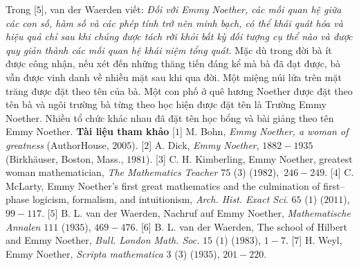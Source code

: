 \begin{multicols}{2}
	\vskip 0.05cm
	Trong [$5$], van der Waerden viết:
	\vskip 0.05cm
	\textit{Đối với Emmy Noether, các mối quan hệ giữa các con số, hàm số và các phép tính trở nên minh bạch, có thể khái quát hóa và hiệu quả chỉ sau khi chúng được tách rời khỏi bất kỳ đối tượng cụ thể nào và được quy giản thành các mối quan hệ khái niệm tổng quát.}
	\vskip 0.05cm
	Mặc dù trong đời bà ít được công nhận, nếu xét đến những thăng tiến đáng kể mà bà đã đạt được, bà vẫn được vinh danh về nhiều mặt sau khi qua đời. Một miệng núi lửa trên mặt trăng được đặt theo tên của bà. Một con phố ở quê hương Noether được đặt theo tên bà và ngôi trường bà từng theo học hiện được đặt tên là Trường Emmy Noether. Nhiều tổ chức khác nhau đã đặt tên học bổng và bài giảng theo tên Emmy Noether.
	\vskip 0.05cm
	\textbf{\color{lichsutoanhoc}Tài liệu tham khảo}
	\vskip 0.05cm
	[$1$] M. Bohn, \textit{Emmy Noether, a woman of greatness} (AuthorHouse, $2005$).
	\vskip 0.05cm
	[$2$] A. Dick, \textit{Emmy Noether}, $1882-1935$ (Birkhäuser, Boston, Mass., $1981$).
	\vskip 0.05cm
	[$3$] C. H. Kimberling, Emmy Noether, greatest woman mathematician, \textit{The Mathematics Teacher} $75$ ($3$) ($1982$),~$246-249$.
	\vskip 0.05cm
	[$4$] C. McLarty, Emmy Noether's first great mathematics and the culmination of first--phase logicism, formalism, and intuitionism, \textit{Arch. Hist. Exact Sci}. $65$ ($1$) ($2011$), $99-117$.
	\vskip 0.05cm
	[$5$] B. L. van der Waerden, Nachruf auf Emmy Noether, \textit{Mathematische Annalen} $111$ ($1935$), $469-476$.
	\vskip 0.05cm
	[$6$] B. L. van der Waerden, The school of Hilbert and Emmy Noether, \textit{Bull. London Math. Soc.} $15$ ($1$) ($1983$), $1-7$.
	\vskip 0.05cm
	[$7$] H. Weyl, Emmy Noether, \textit{Scripta mathematica} $3$ ($3$) ($1935$), $201-220$.
\end{multicols}